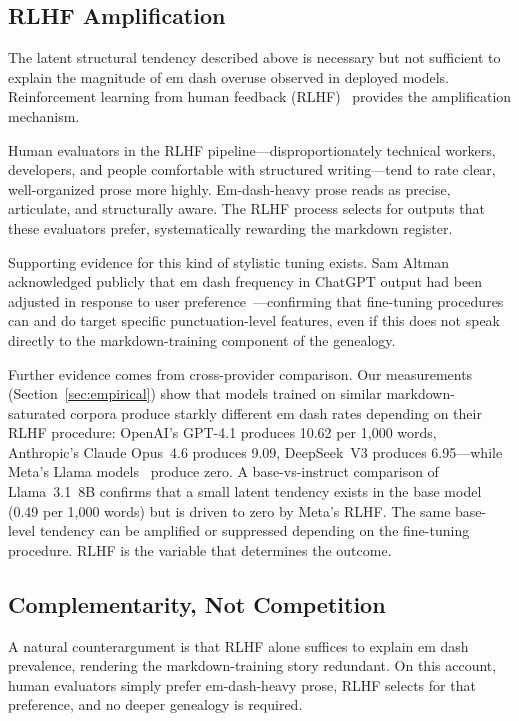 \subsection{RLHF Amplification}

The latent structural tendency described above is necessary but not sufficient to explain the magnitude of em dash overuse observed in deployed models. Reinforcement learning from human feedback (RLHF)~\cite{ouyang2022training, bai2022training, christiano2017deep} provides the amplification mechanism.

Human evaluators in the RLHF pipeline---disproportionately technical workers, developers, and people comfortable with structured writing---tend to rate clear, well-organized prose more highly. Em-dash-heavy prose reads as precise, articulate, and structurally aware. The RLHF process selects for outputs that these evaluators prefer, systematically rewarding the markdown register.

Supporting evidence for this kind of stylistic tuning exists. Sam Altman acknowledged publicly that em dash frequency in ChatGPT output had been adjusted in response to user preference~\cite{altman2024emdash}---confirming that fine-tuning procedures can and do target specific punctuation-level features, even if this does not speak directly to the markdown-training component of the genealogy.

Further evidence comes from cross-provider comparison. Our measurements (Section~\ref{sec:empirical}) show that models trained on similar markdown-saturated corpora produce starkly different em dash rates depending on their RLHF procedure: OpenAI's GPT-4.1 produces 10.62 per 1,000 words, Anthropic's Claude Opus~4.6 produces 9.09, DeepSeek~V3 produces 6.95---while Meta's Llama models~\cite{touvron2023llama, touvron2023llama2} produce zero. A base-vs-instruct comparison of Llama~3.1~8B confirms that a small latent tendency exists in the base model (0.49 per 1,000 words) but is driven to zero by Meta's RLHF. The same base-level tendency can be amplified or suppressed depending on the fine-tuning procedure. RLHF is the variable that determines the outcome.

\subsection{Complementarity, Not Competition}

A natural counterargument is that RLHF alone suffices to explain em dash prevalence, rendering the markdown-training story redundant. On this account, human evaluators simply prefer em-dash-heavy prose, RLHF selects for that preference, and no deeper genealogy is required.

